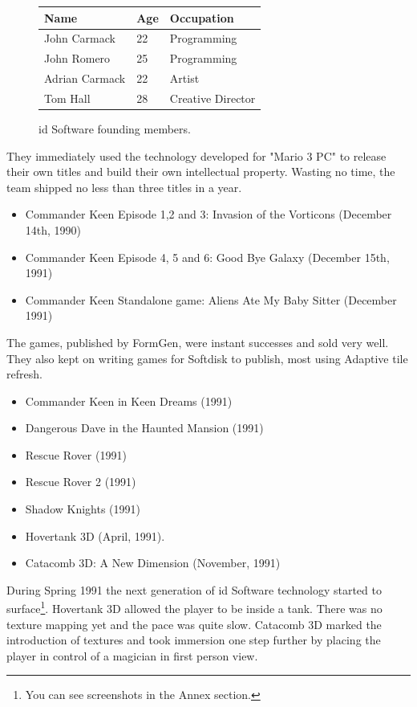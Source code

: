 \documentclass[book.tex]{subfiles}
\begin{document}
 \begin{figure}[H]
\centering  
\begin{tabularx}{\textwidth}{ X  X  X  }
  \toprule
  \textbf{Name} &  \textbf{Age} & \textbf{Occupation} \\
  \toprule 
   John Carmack & 22 &  Programming\\
   John Romero & 25 &  Programming\\
   Adrian Carmack & 22 &  Artist\\
   Tom Hall & 28 &  Creative Director\\
     \toprule
\end{tabularx}
\caption{id Software founding members.}\label{fig:Id Software team}
\end{figure}
They immediately used the technology developed for "Mario 3 PC" to release their own titles and build their own intellectual property. Wasting no time, the team shipped no less than three titles in a year.
\begin{itemize}
    \item Commander Keen Episode 1,2 and 3: Invasion of the Vorticons (December 14th, 1990)
    \item Commander Keen Episode 4, 5 and 6: Good Bye Galaxy (December 15th, 1991)
    \item Commander Keen Standalone game: Aliens Ate My Baby Sitter (December 1991)
\end{itemize}
The games, published by FormGen, were instant successes and sold very well. They also kept on writing games for Softdisk to publish, most using Adaptive tile refresh.
\begin{itemize}
  \item Commander Keen in Keen Dreams (1991)
  \item Dangerous Dave in the Haunted Mansion (1991)
  \item Rescue Rover (1991)
  \item Rescue Rover 2 (1991)
  \item Shadow Knights (1991)
  \item Hovertank 3D (April, 1991).
  \item Catacomb 3D: A New Dimension (November, 1991)
\end{itemize}
During Spring 1991 the next generation of id Software technology started to surface\footnote{You can see screenshots in the Annex section.}. Hovertank 3D allowed the player to be inside a tank. There was no texture mapping yet and the pace was quite slow. Catacomb 3D marked the introduction of textures and took immersion one step further by placing the player in control of a magician in first person view. \\
\par
\end{document}
